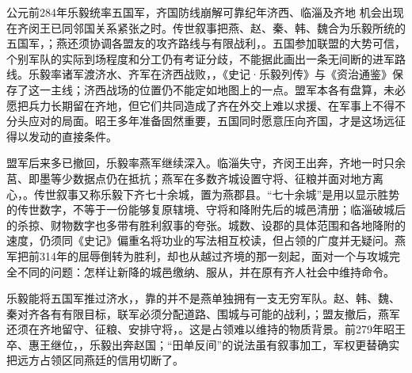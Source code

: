 \begin{event}{公元前284年}{乐毅统率五国军，齐国防线崩解}{可靠纪年}{济西、临淄及齐地}
机会出现在齐闵王已同邻国关系紧张之时。传世叙事把燕、赵、秦、韩、魏合为乐毅所统的五国军，；燕还须协调各盟友的攻齐路线与有限战利，。五国参加联盟的大势可信，个别军队的实际到场程度和分工仍有考证分歧，不能据此画出一条无间断的进军路线。乐毅率诸军渡济水、齐军在济西战败，，《史记·乐毅列传》与《资治通鉴》保存了这一主线；济西战场的位置仍不能定如地图上的一点。盟军本各有盘算，未必愿把兵力长期留在齐地，但它们共同造成了齐在外交上难以求援、在军事上不得不分头应对的局面。昭王多年准备固然重要，五国同时愿意压向齐国，才是这场远征得以发动的直接条件。

盟军后来多已撤回，乐毅率燕军继续深入。临淄失守，齐闵王出奔，齐地一时只余莒、即墨等少数据点仍在抵抗；燕军在多数齐城设置守将、征粮并面对地方离心，。传世叙事又称乐毅下齐七十余城，置为燕郡县。“七十余城”是用以显示胜势的传世数字，不等于一份能够复原辖境、守将和降附先后的城邑清册；临淄破城后的杀掠、财物数字也多带有胜利叙事的夸张。城数、设郡的具体范围和各地降附的速度，仍须同《史记》偏重名将功业的写法相互校读，但占领的广度并无疑问。燕军把前314年的屈辱倒转为胜利，却也从越过齐境的那一刻起，面对一个与攻城完全不同的问题：怎样让新降的城邑缴纳、服从，并在原有齐人社会中维持命令。
\end{event}

乐毅能将五国军推过济水，，靠的并不是燕单独拥有一支无穷军队。赵、韩、魏、秦对齐各有有限目标，联军必须分配道路、围城与可能的战利，；盟友撤后，燕军还须在齐地留守、征粮、安排守将，。这是占领难以维持的物质背景。前279年昭王卒、惠王继位，，乐毅出奔赵国；“田单反间”的说法虽有叙事加工，军权更替确实把远方占领区同燕廷的信用切断了。

